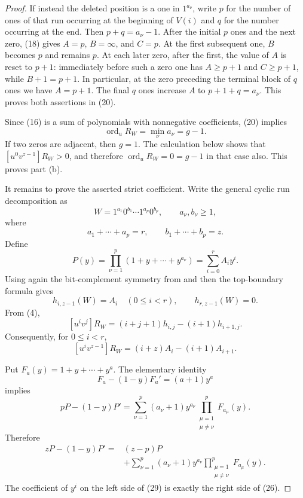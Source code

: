 \documentclass[10pt,a4paper]{article}
\newcommand{\ord}{\operatorname{ord}}
\begin{document}
\begin{proof}
If instead the deleted position is a one in $1^{a_\nu}$, write
$p$ for the number of ones of that run occurring at the beginning of
$V(i)$ and $q$ for the number occurring at the end.  Then
$p+q=a_\nu-1$.  After the initial $p$ ones and the next zero, (18)
gives $A=p$, $B=\infty$, and $C=p$.  At the first subsequent one,
$B$ becomes $p$ and remains $p$.  At each later zero, after the first,
the value of $A$ is reset to $p+1$: immediately before such a zero one
has $A\ge p+1$ and $C\ge p+1$, while $B+1=p+1$.  In particular, at
the zero preceding the terminal block of $q$ ones we have $A=p+1$.
The final $q$ ones increase $A$ to
$p+1+q=a_\nu$.  This proves both assertions in (20).

Since (16) is a sum of polynomials with nonnegative coefficients, (20)
implies
\[
                    \ord_uR_W=\min_\nu a_\nu=g-1.             \tag{21}
\]
If two zeros are adjacent, then $g=1$.  The calculation below shows
that $[u^0v^{z-1}]R_W>0$, and therefore $\ord_uR_W=0=g-1$ in
that case also.  This proves part (b).

It remains to prove the asserted strict coefficient.  Write the general
cyclic run decomposition as
\[
              W=1^{a_1}0^{b_1}\cdots1^{a_p}0^{b_p},
              \qquad a_\nu,b_\nu\geq1,                       \tag{22}
\]
where
\[
              a_1+\cdots+a_p=r,\qquad
              b_1+\cdots+b_p=z.
\]
Define
\[
 P(y)=\prod_{\nu=1}^{p}(1+y+\cdots+y^{a_\nu})
      =\sum_{i=0}^{r}A_i y^i.                                \tag{23}
\]
Using again the bit-complement symmetry from \cite[proof of Theorem 5.2]{Proof}
and then the top-boundary formula \cite[Theorem 8.3, equation (43)]{Proof}
gives
\[
 h_{i,z-1}(W)=A_i\quad(0\leq i<r),
 \qquad h_{r,z-1}(W)=0.                                     \tag{24}
\]
From (4),
\[
 [u^iv^j]R_W=(i+j+1)h_{i,j}-(i+1)h_{i+1,j}.                 \tag{25}
\]
Consequently, for $0\leq i<r$,
\[
 [u^iv^{z-1}]R_W=(i+z)A_i-(i+1)A_{i+1}.                    \tag{26}
\]

Put $F_a(y)=1+y+\cdots+y^a$.  The elementary identity
\[
                 F_a-(1-y)F_a'=(a+1)y^a                    \tag{27}
\]
implies
\[
 pP-(1-y)P'
 =\sum_{\nu=1}^{p}(a_\nu+1)y^{a_\nu}
       \prod_{\substack{\mu=1\\\mu\ne\nu}}^{p}F_{a_\mu}(y).
                                                                    \tag{28}
\]
Therefore
\[
\begin{split}
 zP-(1-y)P'
  ={}&(z-p)P\\
   &+\sum_{\nu=1}^{p}(a_\nu+1)y^{a_\nu}
       \prod_{\substack{\mu=1\\\mu\ne\nu}}^{p}F_{a_\mu}(y).
\end{split}                                                       \tag{29}
\]
The coefficient of $y^i$ on the left side of (29) is exactly the
right side of (26).


\end{proof}
\end{document}
